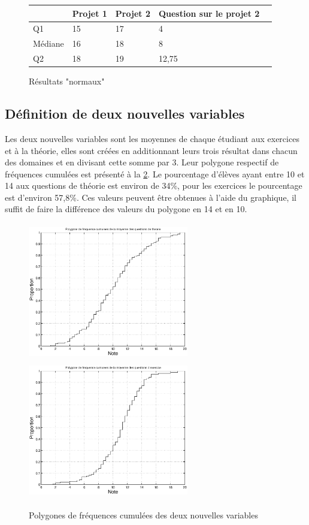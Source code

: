 \documentclass[a4paper, 11pt]{article}
\begin{document}
	\begin{figure}[H]
 	\begin{center}
   			\begin{tabular}{|l|l|l|l|l|}
				\hline
				  & Projet 1 & Projet 2 & Question sur le projet 2 \\
				\hline
				Q1 & 15  &  17  &   4  \\
  				Médiane & 16  &  18  &   8  \\
  				Q2 & 18  & 19  & 12,75\\
				\hline
			\end{tabular}
			\caption{Résultats "normaux"} \label{Q1C2}
		\end{center}
		\end{figure}
\subsection{Définition de deux nouvelles variables}
Les deux nouvelles variables sont les moyennes de chaque étudiant aux exercices et à la théorie, elles sont créées en additionnant leurs trois résultat dans chacun des domaines et en divisant cette somme par 3. Leur polygone respectif de fréquences cumulées est présenté à la \ref{Q1D}. Le pourcentage d'élèves ayant entre 10 et 14 aux questions de théorie est environ de 34\%, pour les exercices le pourcentage est d'environ 57,8\%. Ces valeurs peuvent être obtenues à l'aide du graphique, il suffit de faire la différence des valeurs du polygone en 14 et en 10.
   \begin{figure} [H]
	\begin{center}
		\includegraphics[height=6cm, width = 7cm]{Fig/Q1D1.eps}
		\includegraphics[height=6cm, width = 7cm]{Fig/Q1D2.eps}
		\caption{Polygones de fréquences cumulées des deux nouvelles variables}
		\label{Q1D}
	\end{center}	
	\end{figure}
\end{document}

